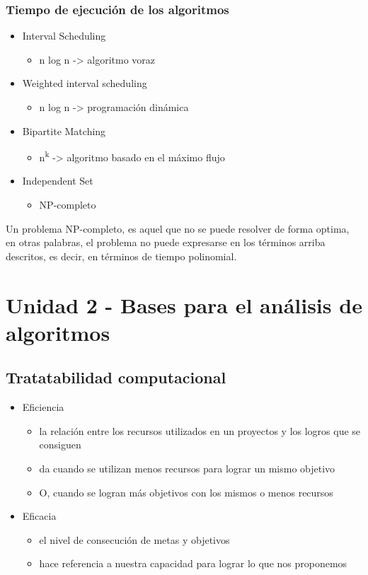 \documentclass[letterpaper, 12pt]{article}
\begin{document}
\subsubsection{Tiempo de ejecución de los algoritmos}
\label{sec:orga191929}
\begin{itemize}
\item Interval Scheduling
\begin{itemize}
\item n log n -> algoritmo voraz
\end{itemize}
\item Weighted interval scheduling
\begin{itemize}
\item n log n -> programación dinámica
\end{itemize}
\item Bipartite Matching
\begin{itemize}
\item n\textsuperscript{k} -> algoritmo basado en el máximo flujo
\end{itemize}
\item Independent Set
\begin{itemize}
\item NP-completo
\end{itemize}
\end{itemize}

Un problema NP-completo, es aquel que no se puede resolver de forma optima, en
otras palabras, el problema no puede expresarse en los términos arriba
descritos, es decir, en términos de tiempo polinomial.
\section{Unidad 2 - Bases para el análisis de algoritmos}
\label{sec:orgd5e9087}
\subsection{Tratatabilidad computacional}
\label{sec:org891fef3}
\begin{itemize}
\item Eficiencia
\begin{itemize}
\item la relación entre los recursos utilizados en un proyectos y los logros que
se consiguen
\item da cuando se utilizan menos recursos para lograr un mismo objetivo
\item O, cuando se logran más objetivos con los mismos o menos recursos
\end{itemize}
\item Eficacia
\begin{itemize}
\item el nivel de consecución de metas y objetivos
\item hace referencia a nuestra capacidad para lograr lo que nos proponemos
\end{itemize}
\end{itemize}
\end{document}
